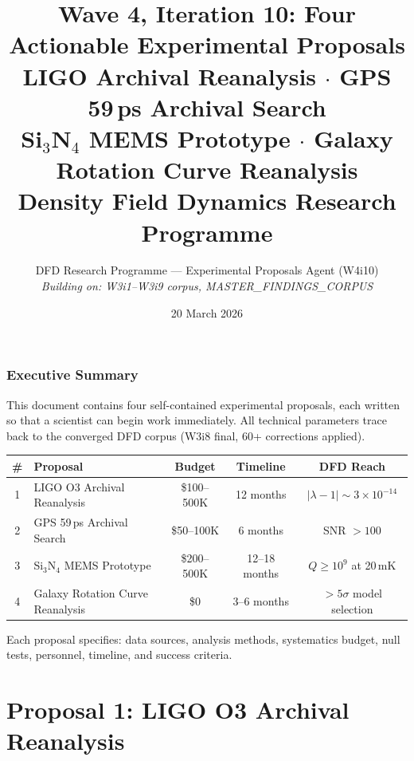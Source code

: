 \documentclass[11pt]{article}
\title{Wave 4, Iteration 10: Four Actionable Experimental Proposals\\
\large LIGO Archival Reanalysis $\cdot$ GPS 59\,ps Archival Search\\
Si$_3$N$_4$ MEMS Prototype $\cdot$ Galaxy Rotation Curve Reanalysis\\[6pt]
\normalsize Density Field Dynamics Research Programme}
\author{DFD Research Programme --- Experimental Proposals Agent (W4i10)\\
\textit{Building on: W3i1--W3i9 corpus, MASTER\_FINDINGS\_CORPUS}}
\date{20 March 2026}
\newcommand{\ee}[1]{\times 10^{#1}}
\newcommand{\lbone}{|\lambda - 1|}
\begin{document}
\maketitle

\section*{Executive Summary}

\begin{tcolorbox}[colback=blue!5!white, colframe=proposalcolor,
  title=\textbf{Four Proposals: From Zero-Cost to \$500K}]

This document contains four self-contained experimental proposals,
each written so that a scientist can begin work immediately.
All technical parameters trace back to the converged DFD corpus
(W3i8 final, 60+ corrections applied).

\begin{center}
\renewcommand{\arraystretch}{1.3}
\begin{tabular}{@{}clccc@{}}
\toprule
\textbf{\#} & \textbf{Proposal} & \textbf{Budget} & \textbf{Timeline} & \textbf{DFD Reach} \\
\midrule
1 & LIGO O3 Archival Reanalysis & \$100--500K & 12 months & $\lbone \sim 3\ee{-14}$ \\
2 & GPS 59\,ps Archival Search & \$50--100K & 6 months & SNR $>100$ \\
3 & Si$_3$N$_4$ MEMS Prototype & \$200--500K & 12--18 months & $Q \geq 10^9$ at 20\,mK \\
4 & Galaxy Rotation Curve Reanalysis & \$0 & 3--6 months & $>5\sigma$ model selection \\
\bottomrule
\end{tabular}
\end{center}

Each proposal specifies: data sources, analysis methods, systematics
budget, null tests, personnel, timeline, and success criteria.
\end{tcolorbox}

\tableofcontents
\newpage


\part{Proposal 1: LIGO O3 Archival Reanalysis}
\label{part:ligo}
\end{document}
